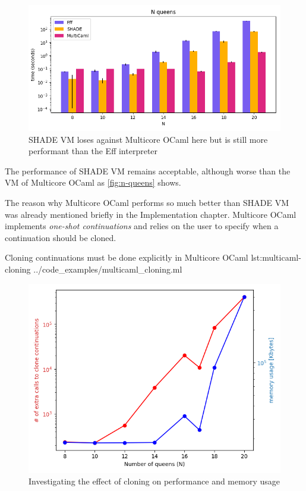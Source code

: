 \documentclass[class=article, crop=false]{standalone}
\begin{document}
\begin{figure}
    \centering
    \includegraphics[width=35em]{eval_plots/comp_queens.png}
    \caption{SHADE VM loses against Multicore OCaml here but is still more
    performant than the Eff interpreter}
    \label{fig:n-queens}
\end{figure}

The performance of SHADE VM remains acceptable, although worse than the VM of
Multicore OCaml as \autoref{fig:n-queens} shows.

The reason why Multicore OCaml performs so much better than SHADE VM was
already mentioned briefly in the Implementation chapter. Multicore OCaml implements
\emph{one-shot continuations} and relies on the user to specify when a continuation
should be cloned.

{Cloning continuations must be done explicitly in Multicore OCaml}
{lst:multicaml-cloning}
{../code_examples/multicaml_cloning.ml}

\begin{figure}
    \centering
    \includegraphics[width=35em]{eval_plots/extra_cloning.png}
    \caption{Investigating the effect of cloning on performance and memory usage}
    \label{fig:extra-copying}
\end{figure}
\end{document}
